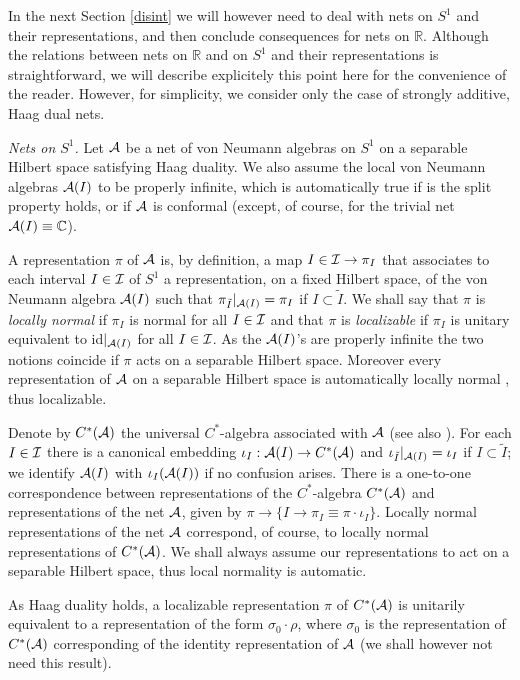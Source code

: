 \documentclass[12pt]{article}
\def\s{{\sigma}}
\def\p{{\pi}}
\def\A{{\cal A}}
\def\I{{\cal I}}
\begin{document}
In the next Section \ref{disint} we will however need to deal with 
nets on $S^1$ and their representations, and then conclude consequences
for nets on $\mathbb R$. Although the relations 
between nets on $\mathbb R$ and on $S^1$ and their representations is 
straightforward, we will describe explicitely this point here for the 
convenience of the reader. However, for simplicity, we consider only 
the case of strongly additive, Haag dual nets.

{\it Nets on $S^1$.} Let $\A$ be a net of von Neumann algebras on 
$S^1$ on a separable Hilbert space satisfying Haag duality.  We also 
assume the local von Neumann algebras $\A(I)$ to be properly infinite, 
which is automatically true if is the split property holds, or if $\A$ 
is conformal (except, of course, for the trivial net 
$\A(I)\equiv\mathbb C$).

A representation $\pi$ of $\A$ is, by definition, a map $I\in\I\to 
\pi_I$ that associates to each interval $I\in\I$ of $S^1$ a 
representation, on a fixed Hilbert space, of the von Neumann algebra 
$\A(I)$ such that $\pi_{\tilde I}|_{\A(I)}=\pi_I$ if $I\subset\tilde 
I$.  We shall say that $\pi$ is {\it locally normal} if $\pi_I$ is 
normal for all $I\in\I$ and that $\pi$ is {\it localizable} if $\pi_I$ 
is unitary equivalent to id$|_{\A(I)}$ for all $I\in\I$.  As the 
$\A(I)$'s are properly infinite the two notions coincide if $\pi$ acts 
on a separable Hilbert space.  Moreover every representation of $\A$ 
on a separable Hilbert space is automatically locally normal 
\cite{Tak}, thus localizable.

Denote by $C^*(\A)$ the universal $C^*$-algebra \cite{FRS} associated 
with $\A$ (see also \cite{GL1}).  For each $I\in\I$ there is a 
canonical embedding $\iota_I: \A(I)\to C^*(\A)$ and $\iota_{\tilde 
I}|_{\A(I)}=\iota_I$ if $I\subset\tilde I$; we identify $\A(I)$ with 
$\iota_I(\A(I))$ if no confusion arises.  There is a one-to-one 
correspondence between representations of the $C^*$-algebra $C^*(\A)$ 
and representations of the net $\A$, given by $\pi\to 
\{I\to\pi_I\equiv \p\cdot\iota_I\}$.  Locally normal representations 
of the net $\A$ correspond, of course, to locally normal 
representations of $C^*(\A)$.  We shall always assume our 
representations to act on a separable Hilbert space, thus local 
normality is automatic.

As Haag duality holds, a localizable representation $\pi$ of $C^*(\A)$ 
is unitarily equivalent to a representation of the form 
$\s_0\cdot\rho$, where $\s_0$ is the representation of $C^*(\A)$ 
corresponding of the identity representation of $\A$ (we shall however 
not need this result).
\end{document}
